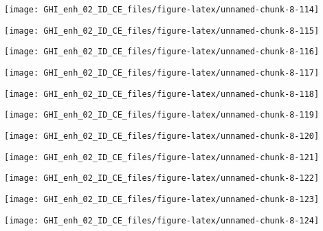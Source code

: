 \documentclass[
  10pt,
  a4paper,oneside]{article}
\begin{document}
\begin{center}\texttt{[image: GHI\_enh\_02\_ID\_CE\_files/figure-latex/unnamed-chunk-8-114]} \end{center}

\begin{center}\texttt{[image: GHI\_enh\_02\_ID\_CE\_files/figure-latex/unnamed-chunk-8-115]} \end{center}

\begin{center}\texttt{[image: GHI\_enh\_02\_ID\_CE\_files/figure-latex/unnamed-chunk-8-116]} \end{center}

\begin{center}\texttt{[image: GHI\_enh\_02\_ID\_CE\_files/figure-latex/unnamed-chunk-8-117]} \end{center}

\begin{center}\texttt{[image: GHI\_enh\_02\_ID\_CE\_files/figure-latex/unnamed-chunk-8-118]} \end{center}

\begin{center}\texttt{[image: GHI\_enh\_02\_ID\_CE\_files/figure-latex/unnamed-chunk-8-119]} \end{center}

\begin{center}\texttt{[image: GHI\_enh\_02\_ID\_CE\_files/figure-latex/unnamed-chunk-8-120]} \end{center}

\begin{center}\texttt{[image: GHI\_enh\_02\_ID\_CE\_files/figure-latex/unnamed-chunk-8-121]} \end{center}

\begin{center}\texttt{[image: GHI\_enh\_02\_ID\_CE\_files/figure-latex/unnamed-chunk-8-122]} \end{center}

\begin{center}\texttt{[image: GHI\_enh\_02\_ID\_CE\_files/figure-latex/unnamed-chunk-8-123]} \end{center}

\begin{center}\texttt{[image: GHI\_enh\_02\_ID\_CE\_files/figure-latex/unnamed-chunk-8-124]} \end{center}
\end{document}
